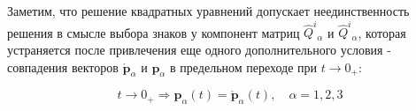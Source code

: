 Заметим, что решение квадратных уравнений допускает
неединственность решения в смысле выбора знаков у компонент матриц
$\widehat{Q}^{i}{ }_{\alpha}$ и $\widehat{Q}^{i}{ }_{\alpha}$, которая
устраняется после привлечения еще одного дополнительного условия - совпадения
векторов $\mathring{\mathbf{p}}_{\alpha}$ и $\mathbf{p}_{\alpha}$ в предельном
переходе при $t \rightarrow 0_{+}:$

\[
t \rightarrow 0_{+} \Rightarrow \mathbf{p}_{\alpha}(t)=\mathring{\mathbf{p}}_{\alpha}(t), \quad \alpha=1,2,3
\]

